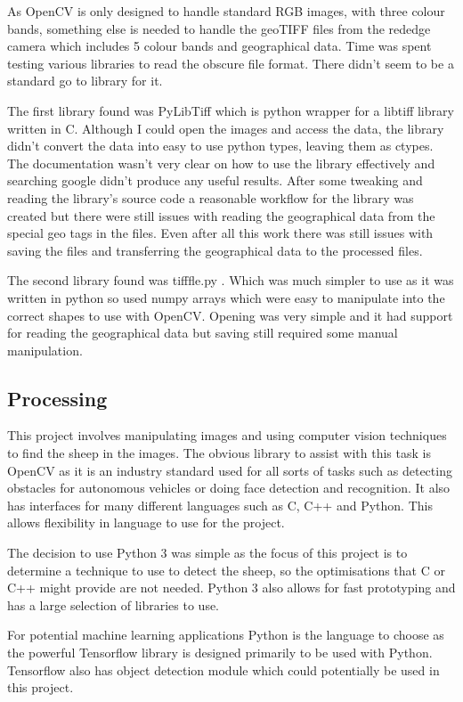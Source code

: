 As OpenCV is only designed to handle standard RGB images, with three colour bands, something else is needed to handle the geoTIFF files from the rededge camera which includes 5 colour bands and geographical data. Time was spent testing various libraries to read the obscure file format. There didn't seem to be a standard go to library for it. 

The first library found was PyLibTiff \cite{pylibtiff} which is python wrapper for a libtiff library written in C. Although I could open the images and access the data, the library didn't convert the data into easy to use python types, leaving them as ctypes. The documentation wasn't very clear on how to use the library effectively and searching google didn't produce any useful results. After some tweaking and reading the library's source code a reasonable workflow for the library was created but there were still issues with reading the geographical data from the special geo tags in the files. Even after all this work there was still issues with saving the files and transferring the geographical data to the processed files.

The second library found was tifffle.py \cite{tifffle}. Which was much simpler to use as it was written in python so used numpy arrays which were easy to manipulate into the correct shapes to use with OpenCV. Opening was very simple and it had support for reading the geographical data but saving still required some manual manipulation.  

\subsection{Processing}
This project involves manipulating images and using computer vision techniques to find the sheep in the images. The obvious library to assist with this task is OpenCV as it is an industry standard used for all sorts of tasks such as detecting obstacles for autonomous vehicles or doing face detection and recognition. It also has interfaces for many different languages such as C, C++ and Python. This allows flexibility in language to use for the project. 

The decision to use Python 3 was simple as the focus of this project is to determine a technique to use to detect the sheep, so the optimisations that C or C++ might provide are not needed. Python 3 also allows for fast prototyping and has a large selection of libraries to use. 

For potential machine learning applications Python is the language to choose as the powerful Tensorflow library is designed primarily to be used with Python. Tensorflow also has object detection module which could potentially be used in this project.


